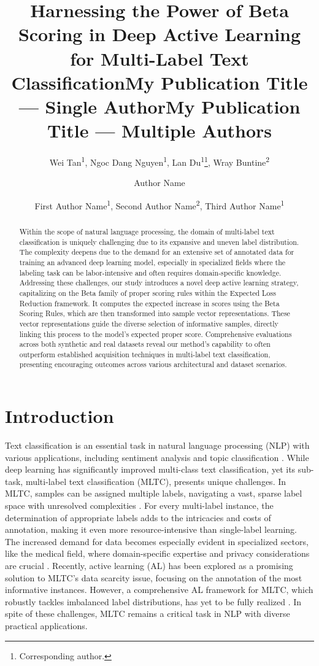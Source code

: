 \documentclass[letterpaper]{article} %
\title{Harnessing the Power of Beta Scoring in Deep Active Learning for Multi-Label Text Classification}
\author{
    Wei Tan\textsuperscript{\rm 1},
    Ngoc Dang Nguyen\textsuperscript{\rm 1},
        Lan Du\textsuperscript{\rm 1}\thanks{Corresponding author.},
        Wray Buntine\textsuperscript{\rm 2}
}
\title{My Publication Title --- Single Author}
\author {
    Author Name
}
\title{My Publication Title --- Multiple Authors}
\author {
    First Author Name\textsuperscript{\rm 1},
    Second Author Name\textsuperscript{\rm 2},
    Third Author Name\textsuperscript{\rm 1}
}
\begin{document}
\maketitle

\begin{abstract}

Within the scope of natural language processing, the domain of multi-label text classification is uniquely challenging due to its expansive and uneven label distribution. The complexity deepens due to the demand for an extensive set of annotated data for training an advanced deep learning model, especially in specialized fields where the labeling task can be labor-intensive and often requires domain-specific knowledge. Addressing these challenges, our study introduces a novel deep active learning strategy, capitalizing on the Beta family of proper scoring rules within the Expected Loss Reduction framework. It computes the expected increase in scores using the Beta Scoring Rules,  which are then transformed into sample vector representations. These vector representations guide the diverse selection of informative samples, directly linking this process to the model's expected proper score.
Comprehensive evaluations across both synthetic and real datasets reveal our method's capability to often outperform established acquisition techniques in multi-label text classification, presenting encouraging outcomes across various architectural and dataset scenarios.

\end{abstract}

\section{Introduction}
\label{sec:Intro}

Text classification is an essential task in natural language processing (NLP) with various applications, including sentiment analysis and topic classification \cite{8719904, 9412588}.
While deep learning has significantly improved multi-class text classification, yet its sub-task, multi-label text classification (MLTC), presents unique challenges.
In MLTC, samples can be assigned multiple labels, navigating a vast, sparse label space with unresolved complexities \citep{10.1145/3077136.3080834, 8830456}.
For every multi-label instance, the determination of appropriate labels adds to the intricacies and costs of annotation, making it even more resource-intensive than single-label learning.
The increased demand for data becomes especially evident in specialized sectors, like the medical field, where domain-specific expertise and privacy considerations are crucial \citep{BUSTOS2020101797}.
Recently, active learning (AL) has been explored as a promising solution to MLTC's data scarcity issue, focusing on the annotation of the most informative instances.
However, a comprehensive AL framework for MLTC, which robustly tackles imbalanced label distributions, has yet to be fully realized \citep{Cherman2019, 10.1145/3379504}.
In spite of these challenges, MLTC remains a critical task in NLP with diverse practical applications.
\end{document}
